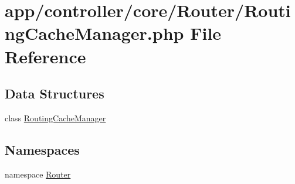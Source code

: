 \hypertarget{_routing_cache_manager_8php}{\section{app/controller/core/\-Router/\-Routing\-Cache\-Manager.php File Reference}
\label{_routing_cache_manager_8php}
}
\subsection*{Data Structures}
\begin{DoxyCompactItemize}
\item 
class \hyperlink{class_router_1_1_routing_cache_manager}{Routing\-Cache\-Manager}
\end{DoxyCompactItemize}
\subsection*{Namespaces}
\begin{DoxyCompactItemize}
\item 
namespace \hyperlink{namespace_router}{Router}
\end{DoxyCompactItemize}
